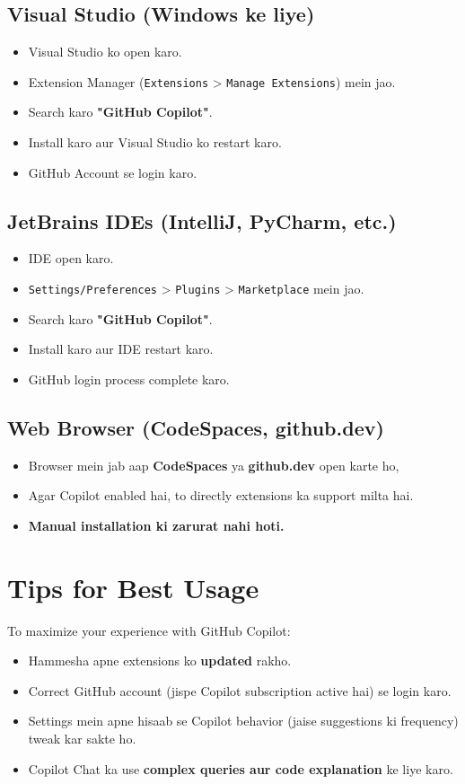 \documentclass[a4paper, 12pt]{article}
\begin{document}
\subsection{Visual Studio (Windows ke liye)}
\begin{itemize}
    \item Visual Studio ko open karo.
    \item Extension Manager (\texttt{Extensions} > \texttt{Manage Extensions}) mein jao.
    \item Search karo \textbf{\color{importantred}"GitHub Copilot"}.
    \item Install karo aur Visual Studio ko restart karo.
    \item GitHub Account se login karo.
\end{itemize}

\subsection{JetBrains IDEs (IntelliJ, PyCharm, etc.)}
\begin{itemize}
    \item IDE open karo.
    \item \texttt{Settings/Preferences} > \texttt{Plugins} > \texttt{Marketplace} mein jao.
    \item Search karo \textbf{\color{importantred}"GitHub Copilot"}.
    \item Install karo aur IDE restart karo.
    \item GitHub login process complete karo.
\end{itemize}

\subsection{Web Browser (CodeSpaces, github.dev)}
\begin{itemize}
    \item Browser mein jab aap \textbf{CodeSpaces} ya \textbf{github.dev} open karte ho,
    \item Agar Copilot enabled hai, to directly extensions ka support milta hai.
    \item \textbf{\color{keyconceptgreen}Manual installation ki zarurat nahi hoti.}
\end{itemize}

\section{Tips for Best Usage}
To maximize your experience with GitHub Copilot:
\begin{itemize}
    \item Hammesha apne extensions ko \textbf{\color{importantred}updated} rakho.
    \item Correct GitHub account (jispe Copilot subscription active hai) se login karo.
    \item Settings mein apne hisaab se Copilot behavior (jaise suggestions ki frequency) tweak kar sakte ho.
    \item Copilot Chat ka use \textbf{\color{keyconceptgreen}complex queries aur code explanation} ke liye karo.
\end{itemize}
\end{document}
